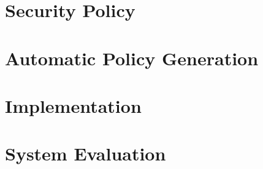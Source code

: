 \section{Security Policy}
\label{sec:esorics_policy}

\section{Automatic Policy Generation}
\label{sec:esorics_APG}

\section{Implementation}
\label{sec:esorics_impl}

\section{System Evaluation}
\label{sec:esorics_evaluation}